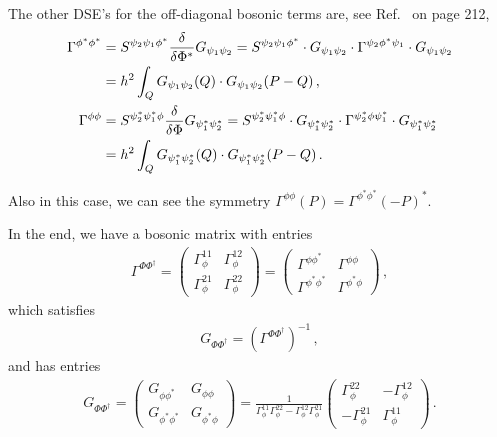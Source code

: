 The other DSE's for the off-diagonal bosonic terms are, see Ref.~\cite{Fetter1971} on page 212,
\begin{align}
	\Gamma^{\phi^*\phi^*} &= S^{\psi_2\psi_1\phi^*}
	\frac{\delta}{\delta\Phi^*} G_{\psi_1\psi_2} = S^{\psi_2\psi_1\phi^*}
	\cdot G_{\psi_1\psi_2} \cdot \Gamma^{\psi_2\phi^*\psi_1} \cdot G_{\psi_1\psi_2} \notag \\
	&= h^2 \int_Q G_{\psi_1\psi_2}(Q)\cdot G_{\psi_1\psi_2}(P-Q) \,, \notag \\
	\Gamma^{\phi\phi} &= S^{\psi_2^*\psi_1^*\phi}
	\frac{\delta}{\delta\Phi} G_{\psi_1^*\psi_2^*} = S^{\psi_2^*\psi_1^*\phi}
	\cdot G_{\psi_1^*\psi_2^*} \cdot \Gamma^{\psi_2^*\phi\psi_1^*} \cdot G_{\psi_1^*\psi_2^*} \notag \\
	&= h^2 \int_Q G_{\psi_1^*\psi_2^*}(Q)\cdot G_{\psi_1^*\psi_2^*}(P-Q) \,.
\end{align}

Also in this case, we can see the symmetry $\Gamma^{\phi\phi}(P) = \Gamma^{\phi^*\phi^*}(-P)^*$.

In the end, we have a bosonic matrix with entries
\begin{align}
	\Gamma^{\Phi\Phi^{\dagger}} =
	\begin{pmatrix}
	\Gamma_{\phi}^{11} & \Gamma_{\phi}^{12} \\
	\Gamma_{\phi}^{21} & \Gamma_{\phi}^{22}
	\end{pmatrix} =
	\begin{pmatrix}
	\Gamma^{\phi\phi^*} & \Gamma^{\phi\phi} \\
	\Gamma^{\phi^*\phi^*} & \Gamma^{\phi^*\phi}
	\end{pmatrix} \,,
\end{align}
which satisfies
\begin{align}
	G_{\Phi\Phi^{\dagger}} = \left(\Gamma^{\Phi\Phi^{\dagger}}\right)^{-1} \,,
\end{align}
and has entries
\begin{align}
	G_{\Phi\Phi^{\dagger}} =
	\begin{pmatrix}
	G_{\phi\phi^*} & G_{\phi\phi} \\
	G_{\phi^*\phi^*} & G_{\phi^*\phi}
	\end{pmatrix}
	= \frac{1}{\Gamma_{\phi}^{11}\Gamma_{\phi}^{22}
	-\Gamma_{\phi}^{12}\Gamma_{\phi}^{21}}
	\begin{pmatrix}
	\Gamma_{\phi}^{22} & -\Gamma_{\phi}^{12} \\
	-\Gamma_{\phi}^{21} & \Gamma_{\phi}^{11}
	\end{pmatrix} \,.
\end{align}

